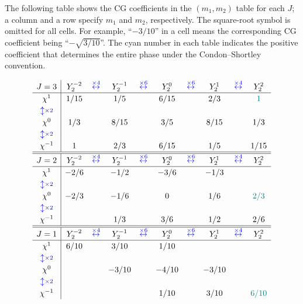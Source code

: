 \documentclass[amsmath,amssymb,prc,aps]{revtex4-2}
\newcommand{\Cyan}[1]{{\color[rgb]{0.0,0.5,0.5}\relax#1}}
\begin{document}
The following table shows the CG coefficients in the $(m_1,m_2)$ table for each
$J$; a column and a row specify $m_1$ and $m_2$, respectively.  The square-root
symbol is omitted for all cells.  For example, ``$-3/10$'' in a cell means the
corresponding CG coefficient being ``$-\sqrt{3/10}$''.  The \Cyan{cyan number}
in each table indicates the positive coefficient that determines the entire
phase under the Condon--Shortley convention.

\begin{align}
  \renewcommand{\arraystretch}{1.2}
  \begin{array}{c|ccccccccc}
  J=3           & Y_2^{-2} & \LadNH{4} & Y_2^{-1} & \LadNH{6} & Y_2^{0} & \LadNH{6} & Y_2^{1} & \LadNH{4} & Y_2^{2} \\ \hline
  \chi^1        & 1/15 && 1/5 && 6/15 && 2/3 && \Cyan{1} \\
  \LadNV{2} \\
  \chi^0        & 1/3 && 8/15 && 3/5 && 8/15 && 1/3 \\
  \LadNV{2} \\
  \chi^{-1}     & 1 && 2/3 && 6/15 && 1/5 && 1/15
  \\\hline\hline
  J=2           & Y_2^{-2} & \LadNH{4} & Y_2^{-1} & \LadNH{6} & Y_2^{0} & \LadNH{6} & Y_2^{1} & \LadNH{4} & Y_2^{2} \\ \hline
  \chi^1        & -2/6 && -1/2 && -3/6 && -1/3 &&  \\
  \LadNV{2} \\
  \chi^0        & -2/3 && -1/6 && 0 && 1/6 && \Cyan{2/3} \\
  \LadNV{2} \\
  \chi^{-1}     &      && 1/3 && 3/6 && 1/2 && 2/6
  \\\hline\hline
  J=1           & Y_2^{-2} & \LadNH{4} & Y_2^{-1} & \LadNH{6} & Y_2^{0} & \LadNH{6} & Y_2^{1} & \LadNH{4} & Y_2^{2} \\ \hline
  \chi^1        & 6/10 && 3/10 && 1/10  &&       &&  \\
  \LadNV{2} \\
  \chi^0        &     && -3/10 && -4/10 && -3/10 &&  \\
  \LadNV{2} \\
  \chi^{-1}     &     &&       && 1/10  && 3/10  && \Cyan{6/10}
  \end{array}
\end{align}
\end{document}
